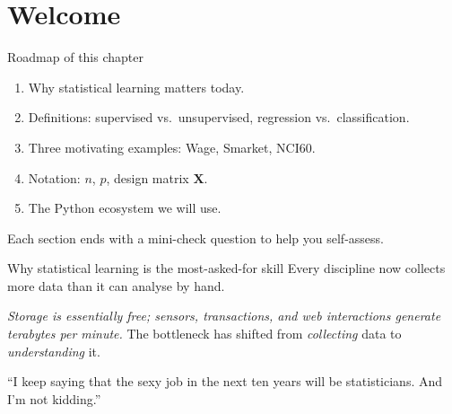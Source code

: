 \documentclass[aspectratio=169,11pt]{beamer}
\begin{document}
\section{Welcome}

\begin{frame}{Roadmap of this chapter}
  \begin{takeaway}
    \begin{enumerate}
      \item Why statistical learning matters today.
      \item Definitions: supervised vs.\ unsupervised, regression vs.\
            classification.
      \item Three motivating examples: Wage, Smarket, NCI60.
      \item Notation: $n$, $p$, design matrix $\mathbf{X}$.
      \item The Python ecosystem we will use.
    \end{enumerate}
  \end{takeaway}
  Each section ends with a mini-check question to help you self-assess.
\end{frame}



\begin{frame}{Why statistical learning is the most-asked-for skill}
  Every discipline now collects more data than it can analyse by hand.
  \begin{takeaway}
    \emph{Storage is essentially free; sensors, transactions, and web
    interactions generate terabytes per minute.} The bottleneck has
    shifted from \emph{collecting} data to \emph{understanding} it.
  \end{takeaway}
  \begin{readme}
    ``I keep saying that the sexy job in the next ten years will be
    statisticians. And I'm not kidding.''
  \end{readme}
\end{frame}
\end{document}
